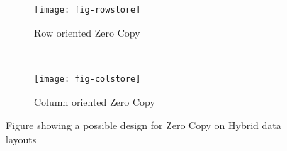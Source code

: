 \begin{figure}[H]
    \centering
    \begin{subfigure}[t]{0.4\textwidth}
        \centering
        \texttt{[image: fig-rowstore]}
        \caption{Row oriented Zero Copy}
    \end{subfigure}%
    ~ 
    \begin{subfigure}[t]{0.4\textwidth}
        \centering
        \texttt{[image: fig-colstore]}
        \caption{Column oriented Zero Copy}
    \end{subfigure}
    \caption{Figure showing a possible design for Zero Copy on Hybrid data layouts}
\label{fig:rowstore-colstore}
\end{figure}